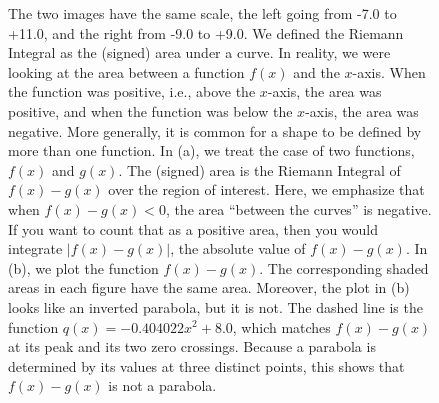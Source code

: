 \begin{figure}[hbt]%
\centering
{}%
\hspace{5pt}%
\centering
{}%
    \caption[]{The two images have the same scale, the left going from -7.0 to +11.0, and the right from -9.0 to +9.0. We defined the Riemann Integral as the (signed) area under a curve. In reality, we were looking at the area between a function $f(x)$ and the $x$-axis. When the function was positive, i.e., above the $x$-axis, the area was positive, and when the function was below the $x$-axis, the area was negative. More generally, it is common for a shape to be defined by more than one function. In (a), we treat the case of two functions, $f(x)$ and $g(x)$. The (signed) area is the Riemann Integral of $f(x)-g(x)$ over the region of interest. Here, we emphasize that when $f(x)-g(x) < 0$, the area ``between the curves'' is negative. If you want to count that as a positive area, then you would integrate $|f(x)-g(x)|$, the absolute value of $f(x)-g(x)$. In (b), we plot the function $f(x) - g(x)$. The corresponding shaded areas in each figure have the same area. Moreover, the plot in (b) looks like an inverted parabola, but it is not. The dashed line is the function $q(x) = -0.404022 x^2 + 8.0$, which matches $f(x)-g(x)$ at its peak and its two zero crossings. Because a parabola is determined by its values at three distinct points, this shows that $f(x)-g(x)$ is not a parabola.}
    \label{fig:AreaBetweenFunctions}
\end{figure}

